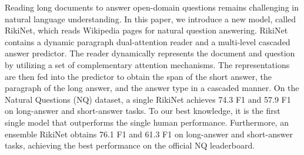 Reading long documents to answer open-domain questions remains challenging in natural language understanding. In this paper, we introduce a new model, called RikiNet, which reads Wikipedia pages for natural question answering. RikiNet contains a dynamic paragraph dual-attention reader and a multi-level cascaded answer predictor. The reader dynamically represents the document and question by utilizing a set of complementary attention mechanisms. The representations are then fed into the predictor to obtain the span of the short answer, the paragraph of the long answer, and the answer type in a cascaded manner. On the Natural Questions (NQ) dataset, a single RikiNet achieves 74.3 F1 and 57.9 F1 on long-answer and short-answer tasks. To our best knowledge, it is the first single model that outperforms the single human performance. Furthermore, an ensemble RikiNet obtains 76.1 F1 and 61.3 F1 on long-answer and short-answer tasks, achieving the best performance on the official NQ leaderboard.
